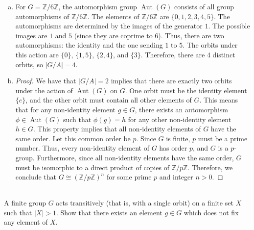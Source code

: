 \documentclass{article}
\def\zz{{\mathbb Z}}
\newtheorem{theorem}{Theorem}[section]
\begin{document}
\begin{enumerate}[(a)]
    \item For $G = \zz/6\zz$, the automorphism group $\operatorname{Aut}(G)$ consists of all group automorphisms of $\zz/6\zz$. The elements of $\zz/6\zz$ are $\{0, 1, 2, 3, 4, 5\}$. The automorphisms are determined by the images of the generator $1$. The possible images are $1$ and $5$ (since they are coprime to $6$). Thus, there are two automorphisms: the identity and the one sending $1$ to $5$. The orbits under this action are $\{0\}$, $\{1, 5\}$, $\{2, 4\}$, and $\{3\}$. Therefore, there are 4 distinct orbits, so $|G/A| = 4$.
    \item \begin{proof}
        We have that $|G/A| = 2$ implies that there are exactly two orbits under the action of $\operatorname{Aut}(G)$ on $G$. One orbit must be the identity element $\{e\}$, and the other orbit must contain all other elements of $G$. This means that for any non-identity element $g \in G$, there exists an automorphism $\phi \in \operatorname{Aut}(G)$ such that $\phi(g) = h$ for any other non-identity element $h \in G$. This property implies that all non-identity elements of $G$ have the same order. Let this common order be $p$. Since $G$ is finite, $p$ must be a prime number. Thus, every non-identity element of $G$ has order $p$, and $G$ is a $p$-group. Furthermore, since all non-identity elements have the same order, $G$ must be isomorphic to a direct product of copies of $\zz/p\zz$. Therefore, we conclude that $G \cong (\zz/p\zz)^n$ for some prime $p$ and integer $n > 0$.
    \end{proof}
\end{enumerate}




\begin{problem} \\
    A finite group $G$ acts transitively (that is, with a single orbit) on a finite set $X$ such that $|X| > 1$. Show that there exists an element $g \in G$ which does not fix any element of $X$.
\end{problem}

\end{document}
